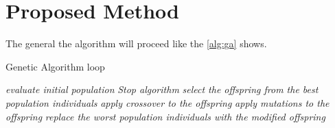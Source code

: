 \documentclass[runningheads]{llncs}
\begin{document}
\section{Proposed Method}
\label{method}

The general the algorithm will proceed like the \autoref{alg:ga} shows.

\begin{algorithm}
  \caption{Genetic Algorithm loop}\label{alg:ga}
  \begin{algorithmic}[1]
    \State \textit{evaluate initial population}
    \State \textit{Stop algorithm}
    \EndIf
    \State \textit{select the offspring from the best population individuals}
    \State \textit{apply crossover to the offspring}
    \State \textit{apply mutations to the offspring}
    \State \textit{replace the worst population individuals with the modified offspring}
    \EndWhile
  \end{algorithmic}
\end{algorithm}
\end{document}
